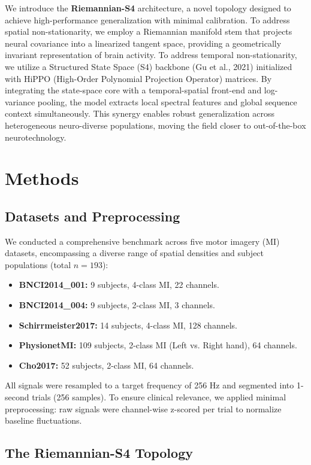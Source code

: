 \documentclass[11pt,a4paper]{article}
\begin{document}
We introduce the \textbf{Riemannian-S4} architecture, a novel topology designed to achieve high-performance generalization with minimal calibration. To address spatial non-stationarity, we employ a Riemannian manifold stem that projects neural covariance into a linearized tangent space, providing a geometrically invariant representation of brain activity. To address temporal non-stationarity, we utilize a Structured State Space (S4) backbone (Gu et al., 2021) initialized with HiPPO (High-Order Polynomial Projection Operator) matrices. By integrating the state-space core with a temporal-spatial front-end and log-variance pooling, the model extracts local spectral features and global sequence context simultaneously. This synergy enables robust generalization across heterogeneous neuro-diverse populations, moving the field closer to out-of-the-box neurotechnology.

\section{Methods}

\subsection{Datasets and Preprocessing}
We conducted a comprehensive benchmark across five motor imagery (MI) datasets, encompassing a diverse range of spatial densities and subject populations (total $n=193$):
\begin{itemize}
    \item \textbf{BNCI2014\_001:} 9 subjects, 4-class MI, 22 channels.
    \item \textbf{BNCI2014\_004:} 9 subjects, 2-class MI, 3 channels.
    \item \textbf{Schirrmeister2017:} 14 subjects, 4-class MI, 128 channels.
    \item \textbf{PhysionetMI:} 109 subjects, 2-class MI (Left vs. Right hand), 64 channels.
    \item \textbf{Cho2017:} 52 subjects, 2-class MI, 64 channels.
\end{itemize}
All signals were resampled to a target frequency of 256 Hz and segmented into 1-second trials (256 samples). To ensure clinical relevance, we applied minimal preprocessing: raw signals were channel-wise z-scored per trial to normalize baseline fluctuations.

\subsection{The Riemannian-S4 Topology}
\end{document}
